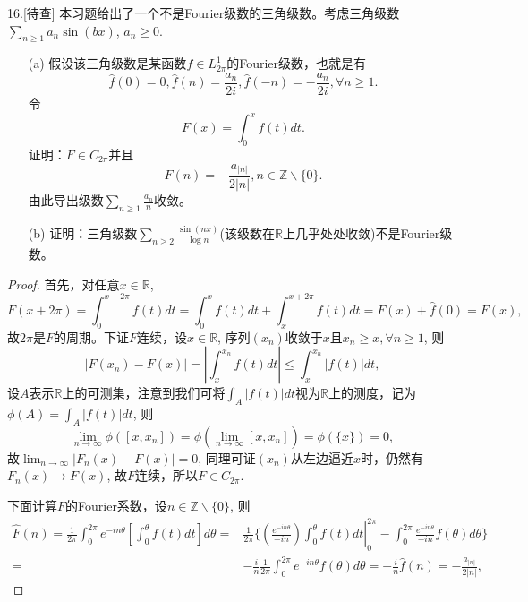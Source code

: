 \documentclass[a4paper,8pt]{ctexart}\textwidth 140mm \textheight 216mm
\newcommand{\8}{\infty}
\begin{document}
16.[待查] 本习题给出了一个不是Fourier级数的三角级数。考虑三角级数$\sum_{n\geq 1}a_n\sin(bx)$, $a_n\geq 0$.
\begin{enumerate}
	\item[(a)] 假设该三角级数是某函数$f\in L_{2\pi}^1$的Fourier级数，也就是有
	\begin{equation*}
		\hat{f}(0)=0,\hat{f}(n)=\frac{a_n}{2i},\hat{f}(-n)=-\frac{a_n}{2i},\forall n\geq 1.
	\end{equation*}
	令
	$$F(x)=\int_0^x f(t)dt.$$
	证明：$F\in C_{2\pi}$并且
	\begin{equation*}
		\hat{F}(n)=-\frac{a_{|n|}}{2|n|},n\in\mathbb{Z}\backslash\{0\}.
	\end{equation*}
	由此导出级数$\sum_{n\geq 1}\frac{a_n}{n}$收敛。
	\item[(b)] 证明：三角级数$\sum_{n\geq 2}\frac{\sin(nx)}{\log n}$(该级数在$\mathbb{R}$上几乎处处收敛)不是Fourier级数。
\end{enumerate}
\begin{proof}
	首先，对任意$x\in \mathbb{R}$, 
	\begin{equation*}
		F(x+2\pi)=\int_0^{x+2\pi}f(t)dt=\int_0^x f(t)dt+\int_x^{x+2\pi}f(t)dt=F(x)+\hat{f}(0)=F(x),
	\end{equation*}
	故$2\pi$是$F$的周期。下证$F$连续，设$x\in\mathbb{R}$, 序列$(x_n)$收敛于$x$且$x_n\geq x,\forall n\geq 1$, 则
	\begin{equation*}
		|F(x_n)-F(x)|=|\int_{x}^{x_n}f(t)dt|\leq \int_{x}^{x_n}|f(t)|dt,
	\end{equation*}
	设$A$表示$\mathbb{R}$上的可测集，注意到我们可将$\int_A |f(t)|dt$视为$\mathbb{R}$上的测度，记为\mbox{$\phi(A)=\int_A |f(t)|dt$}, 则
	\begin{equation*}
		\lim_{n\to\infty}\phi([x,x_n])=\phi(\lim_{n\to\infty}[x,x_n])=\phi(\{x\})=0,
	\end{equation*}
	故$\lim_{n\to\infty}|F_n(x)-F(x)|=0$, 同理可证$(x_n)$从左边逼近$x$时，仍然有$F_n(x)\to F(x)$, 故$F$连续，所以$F\in C_{2\pi}$.
	
	下面计算$F$的Fourier系数，设$n\in\mathbb{Z}\backslash \{0\}$, 则
	\begin{equation*}
	\begin{split}
	\hat{F}(n)=\frac{1}{2\pi}\int_0^{2\pi}e^{-in\theta}[\int_0^\theta f(t)dt]d\theta=&\frac{1}{2\pi}\{\left(\left.\frac{e^{-in\theta}}{-in}\right)\int_0^\theta f(t)dt\right|_0^{2\pi}-\int_0^{2\pi}\frac{e^{-in\theta}}{-in}f(\theta)d\theta\}\\
	=&-\frac{i}{n}\frac{1}{2\pi}\int_0^{2\pi}e^{-in\theta}f(\theta)d\theta=-\frac{i}{n}\hat{f}(n)=-\frac{a_{|n|}}{2|n|},
	\end{split}
	\end{equation*}
\end{proof}
\end{document}

